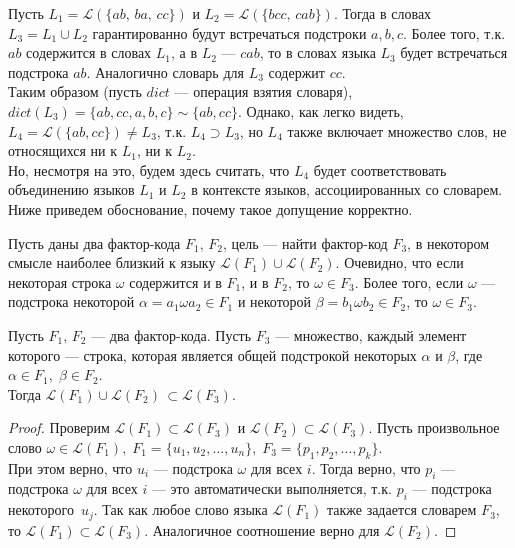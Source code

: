 \documentclass[14pt, russian]{scrartcl}
\newcommand{\Lang}{\ensuremath{\mathcal{L}}}
\begin{document}
\begin{Example}
    Пусть $L_1 = \Lang(\{ab,\, ba,\, cc\})$ и  $L_2 = \Lang(\{bcc,\, cab\})$.
    Тогда в словах $L_3 = L_1 \cup L_2$ гарантированно будут встречаться подстроки $a, b, c$. Более того, т.к. $ab$ содержится в словах $L_1$, а в $L_2$ --- $cab$, то в словах языка $L_3$ будет встречаться подстрока $ab$. Аналогично словарь для $L_3$ содержит $cc$. \\
    Таким образом (пусть $dict$ --- операция взятия словаря), $dict(L_3) = \{ab, cc, a, b, c\} \sim \{ab, cc\}$. Однако, как легко видеть, $L_4 =\Lang(\{ab, cc\}) \neq L_3$, т.к. $L_4 \supset L_3$, но $L_4$ также включает множество слов, не относящихся ни к $L_1$, ни к $L_2$.  \\
	Но, несмотря на это, будем здесь считать, что $L_4$ будет соответствовать объединению языков $L_1$ и $L_2$ в контексте языков, ассоциированных со словарем. Ниже приведем обоснование, почему такое допущение корректно.
\end{Example}

Пусть даны два фактор-кода $F_1, \, F_2$, цель --- найти фактор-код $F_3$, в некотором смысле наиболее близкий к языку $\Lang(F_1) \cup \Lang(F_2)$.
Очевидно, что если некоторая строка $\omega$ содержится и в $F_1$, и в $F_2$, то $\omega \in F_3$. Более того, если $\omega$ --- подстрока некоторой $\alpha = a_1\omega a_2 \in F_1 $ и некоторой $\beta = b_1 \omega b_2 \in F_2$, то $\omega \in F_3$.

\begin{Statement}
    Пусть $F_1, \, F_2$ --- два фактор-кода. Пусть $F_3$ --- множество, каждый элемент которого --- строка, которая является общей подстрокой некоторых $\alpha$ и $\beta$, где $\alpha \in F_1 ,\; \beta \in F_2$. 
    \\
    Тогда $\Lang(F_1) \cup \Lang(F_2) \, \subset \Lang(F_3)$.
\end{Statement}

\begin{proof}
    Проверим $\Lang(F_1) \subset \Lang(F_3)$ и $\Lang(F_2) \subset \Lang(F_3)$.
    Пусть произвольное слово $\omega \in \Lang(F_1), \; F_1 = \{ u_1, u_2, ..., u_n\}, \; 
    F_3 = \{p_1, p_2, ..., p_k\}$.
    \\
    При этом верно, что $u_i$ --- подстрока $\omega$ для всех $i$. Тогда верно, что $p_i$ --- подстрока $\omega$ для всех $i$ --- это автоматически выполняется, т.к. $p_i$ --- подстрока некоторого~$u_j$. 
    Так как любое слово языка $\Lang(F_1)$ также задается словарем $F_3$, то 
    $\Lang(F_1) \subset \Lang(F_3)$. Аналогичное соотношение верно для $\Lang(F_2)$.
\end{proof}
\end{document}
